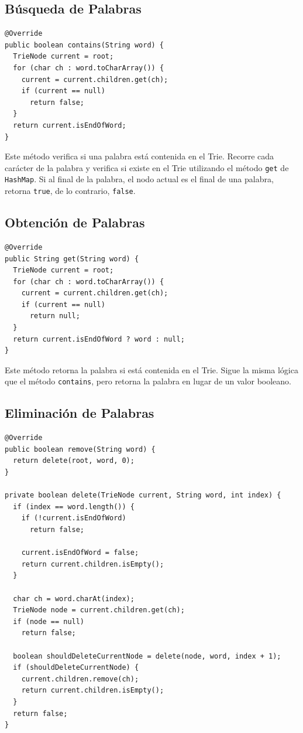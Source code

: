 \documentclass[11pt, a4paper]{article}
\begin{document}
\subsection{Búsqueda de Palabras}
\begin{verbatim}
@Override
public boolean contains(String word) {
  TrieNode current = root;
  for (char ch : word.toCharArray()) {
    current = current.children.get(ch);
    if (current == null)
      return false;
  }
  return current.isEndOfWord;
}
\end{verbatim}

Este método verifica si una palabra está contenida en el Trie. Recorre cada carácter de la palabra y verifica si existe en el Trie utilizando el método \texttt{get} de \texttt{HashMap}. Si al final de la palabra, el nodo actual es el final de una palabra, retorna \texttt{true}, de lo contrario, \texttt{false}.

\subsection{Obtención de Palabras}
\begin{verbatim}
@Override
public String get(String word) {
  TrieNode current = root;
  for (char ch : word.toCharArray()) {
    current = current.children.get(ch);
    if (current == null)
      return null;
  }
  return current.isEndOfWord ? word : null;
}
\end{verbatim}

Este método retorna la palabra si está contenida en el Trie. Sigue la misma lógica que el método \texttt{contains}, pero retorna la palabra en lugar de un valor booleano.

\subsection{Eliminación de Palabras}
\begin{verbatim}
@Override
public boolean remove(String word) {
  return delete(root, word, 0);
}

private boolean delete(TrieNode current, String word, int index) {
  if (index == word.length()) {
    if (!current.isEndOfWord)
      return false;

    current.isEndOfWord = false;
    return current.children.isEmpty();
  }

  char ch = word.charAt(index);
  TrieNode node = current.children.get(ch);
  if (node == null)
    return false;

  boolean shouldDeleteCurrentNode = delete(node, word, index + 1);
  if (shouldDeleteCurrentNode) {
    current.children.remove(ch);
    return current.children.isEmpty();
  }
  return false;
}
\end{verbatim}
\end{document}
